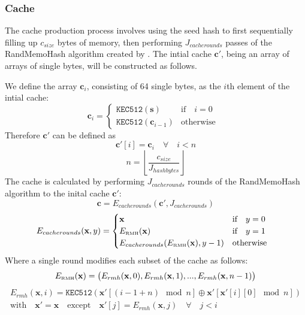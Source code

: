 \documentclass[9pt,oneside]{amsart}
\begin{document}
\subsubsection{Cache}
The cache production process involves using the seed hash to first sequentially filling up $c_{size}$ bytes of memory, then performing $J_{cacherounds}$ passes of the RandMemoHash algorithm created by \cite{lerner2014randmemohash}. The intial cache $\mathbf{c'}$, being an array of arrays of single bytes, will be constructed as follows.

We define the array $\mathbf{c}_{i}$, consisting of 64 single bytes,  as the $i$th element of the intial cache:
\begin{equation}
 \mathbf{c}_{i} = \begin{cases}
\texttt{KEC512}(\mathbf{s}) & \text{if} \quad i = 0 \quad  \\
\texttt{KEC512}(\mathbf{c}_{i-1}) & \text{otherwise}
\end{cases}
\end{equation}
Therefore $ \mathbf{c'}$ can be defined as
\begin{equation}
 \mathbf{c'}[i] = \mathbf{c}_{i} \quad \forall \quad i < n
\end{equation}
\begin{equation}
 n = \left\lfloor\frac{c_{size}}{J_{hashbytes}}\right\rfloor
\end{equation}
The cache is calculated by performing $J_{cacherounds}$ rounds of the RandMemoHash algorithm to the inital cache $\mathbf{c'}$:
\begin{equation}
 \mathbf{c} = E_{cacherounds}(\mathbf{c'}, J_{cacherounds})
\end{equation}
\begin{equation}
 E_{cacherounds}(\mathbf{x}, y) = \begin{cases}
\mathbf{x} & \text{if} \quad y = 0 \quad  \\
E_\text{\tiny RMH}(\mathbf{x}) & \text{if} \quad y = 1 \quad  \\
E_{cacherounds}(E_\text{\tiny RMH}(\mathbf{x}), y -1 ) & \text{otherwise}
\end{cases}
\end{equation}
Where a single round modifies each subset of the cache as follows:
\begin{equation}
 E_\text{\tiny RMH}(\mathbf{x}) = \big( E_{rmh}(\mathbf{x}, 0), E_{rmh}(\mathbf{x}, 1), ... , E_{rmh}(\mathbf{x}, n - 1) \big)
\end{equation}
\begin{multline}
  E_{rmh}(\mathbf{x}, i) = \texttt{KEC512}(\mathbf{x'}[(i - 1 + n) \mod n] \oplus \mathbf{x'}[\mathbf{x'}[i][0] \mod n]) \\
  \text{with} \quad \mathbf{x'} = \mathbf{x} \quad \text{except} \quad \mathbf{x'}[j] = E_{rmh}(\mathbf{x}, j) \quad \forall \quad j < i
\end{multline}
\end{document}
